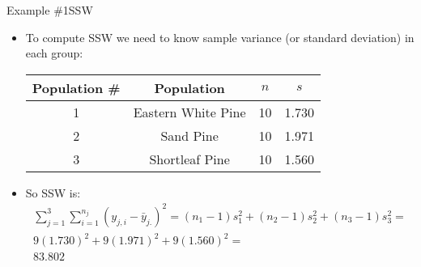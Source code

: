 \documentclass[xcolor=dvipsnames]{beamer}
\begin{document}
\begin{frame}{Example \#1}{SSW}
	\begin{itemize}
	\item To compute SSW we need to know sample variance (or standard deviation) in each group: \pause
		\begin{center}
			\begin{tabular}{|c|c|c|c|}
				\hline
				\textbf{Population \#} & \textbf{Population} & $n$ & \textbf{$s$} \\
				\hline \hline
				1  & Eastern White Pine    &   10 &  1.730 \\ \hline 
				2 &  Sand Pine              & 10 &   1.971\\ \hline 
				3 &  Shortleaf Pine        &  10 &   1.560\\ \hline 
			\end{tabular}
		\end{center}\pause
				\vspace{2mm}
	\item So SSW is:\pause
	\begin{gather*}
		\sum_{j=1}^{3}\sum_{i = 1}^{n_j} (y_{j,i}-\bar{y}_{j.})^2 = (n_1-1)s_1^2 + (n_2-1)s_2^2 + (n_3-1)s_3^2 =\\ 
		9(1.730)^2 + 9(1.971)^2 + 9(1.560)^2 = \\
		83.802
	\end{gather*}
	\end{itemize}
\end{frame}
\end{document}
